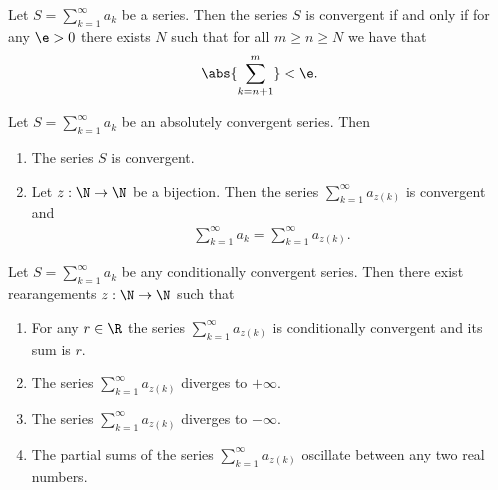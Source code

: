 \documentclass{article}
\begin{document}
\begin{theorem}
    Let $S=\sum_{k=1}^\infty a_k$ be a series. Then the series $S$ is convergent
    if and only if for any $\e>0$ there exists $N$ such that for all $m\geq n\geq N$
    we have that
    \begin{align*}
        \abs{\sum_{k=n+1}^m}<\e.
    \end{align*} 
\end{theorem}

\begin{theorem}[Notes 1.8]
    Let $S=\sum_{k=1}^\infty a_k$ be an absolutely convergent series. Then
    \begin{enumerate}
        \item The series $S$ is convergent.
        \item Let $z:\N\to\N$ be a bijection. Then the series $\sum_{k=1}^\infty a_{z(k)}$
            is convergent and \begin{align*}
                \sum_{k=1}^\infty a_k = \sum_{k=1}^\infty a_{z(k)}.
            \end{align*}
    \end{enumerate} 
\end{theorem}

\begin{theorem}[Notes 1.9]
    Let $S=\sum_{k=1}^\infty a_k$ be any conditionally convergent series. Then there
    exist rearangements $z:\N\to\N$ such that
    \begin{enumerate}
        \item For any $r\in\R$ the series $\sum_{k=1}^\infty a_{z(k)}$ is conditionally
            convergent and its sum is $r$.
        \item The series $\sum_{k=1}^\infty a_{z(k)}$ diverges to $+\infty$.
        \item The series $\sum_{k=1}^\infty a_{z(k)}$ diverges to $-\infty$.
        \item The partial sums of the series $\sum_{k=1}^\infty a_{z(k)}$ oscillate between any two real numbers.
    \end{enumerate} 
\end{theorem}
\end{document}
